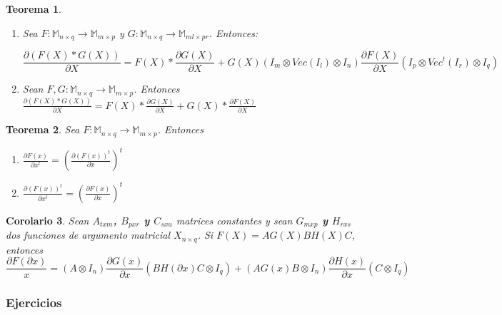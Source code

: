 \documentclass{article}
\theoremstyle{theorem-style}  %
\newtheorem{theorem}{Teorema}[section]  %
\newtheorem{corollary}[theorem]{Corolario} %
\theoremstyle{definition-style}
\theoremstyle{example-style}
\theoremstyle{exercise-style}
\begin{document}
\begin{theorem}
\begin{enumerate}
			$$ \frac{\partial \Phi(F(X))}{\partial X} = \frac{\partial \Phi(X)}{\partial Y} \frac{\partial Y}{\partial X}$$ 
			
			
			\item Sea $F: \mathbb{M}_{n \times q} \rightarrow \mathbb{M}_{m \times p}$ y $G: \mathbb{M}_{n \times q} \rightarrow \mathbb{M}_{ml \times pr}$. Entonces:
			
			$$ \frac{\partial(F(X) * G(X))}{\partial X} = F(X)*\frac{\partial G(X)}{\partial X} + G(X)(I_m \otimes Vec(I_l) \otimes I_n)\frac{\partial F(X)}{\partial X}(I_p \otimes Vec^t(I_r) \otimes I_q)$$
			
			\item Sean $F, G: \mathbb{M}_{n \times q} \rightarrow \mathbb{M}_{m \times p}$. Entonces $ \frac{\partial(F(X) * G(X))}{\partial X} = F(X)*\frac{\partial G(X)}{\partial X} + G(X)* \frac{\partial F(X)}{\partial X}$
		\end{enumerate}
	\end{theorem}
	
	\begin{theorem}
		\textit{Sea $F:\mathbb{M}_{n\times q}\rightarrow \mathbb{M}_{m\times p}$. Entonces }
		\begin{enumerate}
			\item $\frac{\partial F(x)}{\partial x^t} =(\frac{\partial (F(x))^t}{\partial x})^t $
			
			\item $\frac{\partial (F(x))^t}{\partial x^t} =(\frac{\partial F(x)}{\partial x})^t$
		\end{enumerate}
	\end{theorem}
	
	\begin{corollary}
		\textit{	Sean \textbf{$A_{txm}$, $B_{pxr}$ y $C_{sxu}$} matrices constantes y sean \textbf{$G_{mxp}$ y $H_{rxs}$} dos funciones de argumento matricial $X_{n\times 	q}$. Si \textbf{$F(X) = AG(X)BH(X)C$}, entonces
			\textbf{$$ \frac{\partial F(\partial x)}{x}= (A \otimes I_n)\frac{\partial G(x)}{\partial x}(BH(\partial x)C \otimes I_q) + (AG(x)B \otimes I_n)\frac{\partial H(x)}{\partial x}(C \otimes I_q)$$}
		}
	\end{corollary}
	
	\subsubsection{Ejercicios}
	
\end{document}
